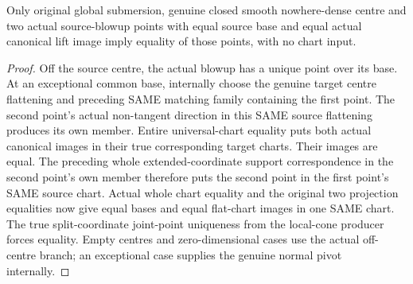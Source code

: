\begin{theorem}
\label{hir:submersion-blowup-pivot-canonical-joint-unique}
\leanok
{}
Only original global submersion, genuine closed smooth nowhere-dense centre
and two actual source-blowup points with equal source base and equal actual
canonical lift image imply equality of those points, with no chart input.
\end{theorem}
\begin{proof}
Off the source centre, the actual blowup has a unique point over its base.
At an exceptional common base, internally choose the genuine target centre
flattening and preceding SAME matching family containing the first point.
The second point's actual non-tangent direction in this SAME source
flattening produces its own member. Entire universal-chart equality puts
both actual canonical images in their true corresponding target charts.
Their images are equal. The preceding whole extended-coordinate support
correspondence in the second point's own member therefore puts the second
point in the first point's SAME source chart. Actual whole chart equality
and the original two projection equalities now give equal bases and equal
flat-chart images in one SAME chart. The true split-coordinate joint-point
uniqueness from the local-cone producer forces equality. Empty centres and
zero-dimensional cases use the actual off-centre branch; an exceptional
case supplies the genuine normal pivot internally.
\end{proof}

